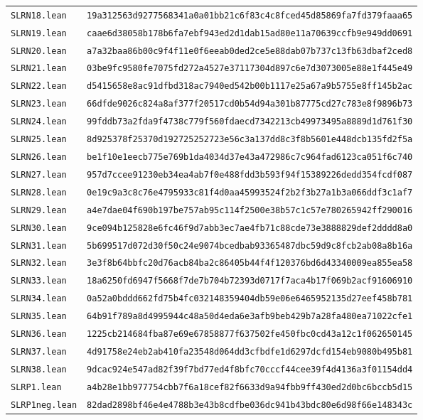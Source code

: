 \documentclass[10pt]{article}
\begin{document}
\begin{center}
\begin{tabular}{ll}
\texttt{SLRN18.lean} & \texttt{19a312563d9277568341a0a01bb21c6f83c4c8fced45d85869fa7fd379faaa65}\\
\texttt{SLRN19.lean} & \texttt{caae6d38058b178b6fa7ebf943ed2d1dab15ad80e11a70639ccfb9e949dd0691}\\
\texttt{SLRN20.lean} & \texttt{a7a32baa86b00c9f4f11e0f6eeab0ded2ce5e88dab07b737c13fb63dbaf2ced8}\\
\texttt{SLRN21.lean} & \texttt{03be9fc9580fe7075fd272a4527e37117304d897c6e7d3073005e88e1f445e49}\\
\texttt{SLRN22.lean} & \texttt{d5415658e8ac91dfbd318ac7940ed542b00b1117e25a67a9b5755e8ff145b2ac}\\
\texttt{SLRN23.lean} & \texttt{66dfde9026c824a8af377f20517cd0b54d94a301b87775cd27c783e8f9896b73}\\
\texttt{SLRN24.lean} & \texttt{99fddb73a2fda9f4738c779f560fdaecd7342213cb49973495a8889d1d761f30}\\
\texttt{SLRN25.lean} & \texttt{8d925378f25370d192725252723e56c3a137dd8c3f8b5601e448dcb135fd2f5a}\\
\texttt{SLRN26.lean} & \texttt{be1f10e1eecb775e769b1da4034d37e43a472986c7c964fad6123ca051f6c740}\\
\texttt{SLRN27.lean} & \texttt{957d7ccee91230eb34ea4ab7f0e488fdd3b593f94f15389226dedd354fcdf087}\\
\texttt{SLRN28.lean} & \texttt{0e19c9a3c8c76e4795933c81f4d0aa45993524f2b2f3b27a1b3a066ddf3c1af7}\\
\texttt{SLRN29.lean} & \texttt{a4e7dae04f690b197be757ab95c114f2500e38b57c1c57e780265942ff290016}\\
\texttt{SLRN30.lean} & \texttt{9ce094b125828e6fc46f9d7abb3ec7ae4fb71c88cde73e3888829def2dddd8a0}\\
\texttt{SLRN31.lean} & \texttt{5b699517d072d30f50c24e9074bcedbab93365487dbc59d9c8fcb2ab08a8b16a}\\
\texttt{SLRN32.lean} & \texttt{3e3f8b64bbfc20d76acb84ba2c86405b44f4f120376bd6d43340009ea855ea58}\\
\texttt{SLRN33.lean} & \texttt{18a6250fd6947f5668f7de7b704b72393d0717f7aca4b17f069b2acf91606910}\\
\texttt{SLRN34.lean} & \texttt{0a52a0bddd662fd75b4fc032148359404db59e06e6465952135d27eef458b781}\\
\texttt{SLRN35.lean} & \texttt{64b91f789a8d4995944c48a50d4eda6e3afb9beb429b7a28fa480ea71022cfe1}\\
\texttt{SLRN36.lean} & \texttt{1225cb214684fba87e69e67858877f637502fe450fbc0cd43a12c1f062650145}\\
\texttt{SLRN37.lean} & \texttt{4d91758e24eb2ab410fa23548d064dd3cfbdfe1d6297dcfd154eb9080b495b81}\\
\texttt{SLRN38.lean} & \texttt{9dcac924e547ad82f39f7bd77ed4f8bfc70cccf44cee39f4d4136a3f01154dd4}\\
\texttt{SLRP1.lean} & \texttt{a4b28e1bb977754cbb7f6a18cef82f6633d9a94fbb9ff430ed2d0bc6bccb5d15}\\
\texttt{SLRP1neg.lean} & \texttt{82dad2898bf46e4e4788b3e43b8cdfbe036dc941b43bdc80e6d98f66e148343c}\\
\bottomrule\end{tabular}\end{center}
\end{document}
